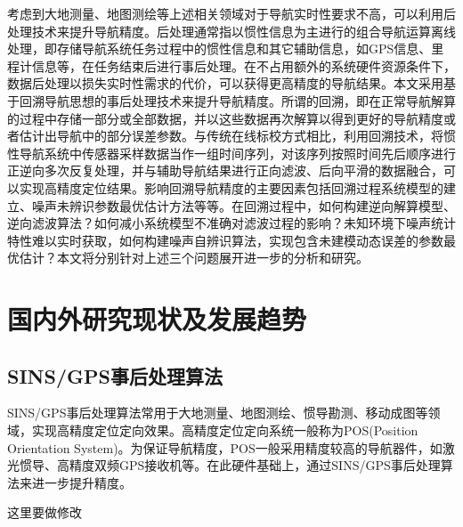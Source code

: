 考虑到大地测量、地图测绘等上述相关领域对于导航实时性要求不高，可以利用后处理技术来提升导航精度。后处理通常指以惯性信息为主进行的组合导航运算离线处理，即存储导航系统任务过程中的惯性信息和其它辅助信息，如GPS信息、里程计信息等，在任务结束后进行事后处理。在不占用额外的系统硬件资源条件下，数据后处理以损失实时性需求的代价，可以获得更高精度的导航结果。本文采用基于回溯导航思想的事后处理技术来提升导航精度。所谓的回溯，即在正常导航解算的过程中存储一部分或全部数据，并以这些数据再次解算以得到更好的导航精度或者估计出导航中的部分误差参数。与传统在线标校方式相比，利用回溯技术，将惯性导航系统中传感器采样数据当作一组时间序列，对该序列按照时间先后顺序进行正逆向多次反复处理，并与辅助导航结果进行正向滤波、后向平滑的数据融合，可以实现高精度定位结果。影响回溯导航精度的主要因素包括回溯过程系统模型的建立、噪声未辨识参数最优估计方法等等。在回溯过程中，如何构建逆向解算模型、逆向滤波算法？如何减小系统模型不准确对滤波过程的影响？未知环境下噪声统计特性难以实时获取，如何构建噪声自辨识算法，实现包含未建模动态误差的参数最优估计？本文将分别针对上述三个问题展开进一步的分析和研究。


\section{国内外研究现状及发展趋势}

\subsection{SINS/GPS事后处理算法}

SINS/GPS事后处理算法常用于大地测量、地图测绘、惯导勘测、移动成图等领域，实现高精度定位定向效果。高精度定位定向系统一般称为POS(Position Orientation System)。为保证导航精度，POS一般采用精度较高的导航器件，如激光惯导、高精度双频GPS接收机等。在此硬件基础上，通过SINS/GPS事后处理算法来进一步提升精度。

这里要做修改

